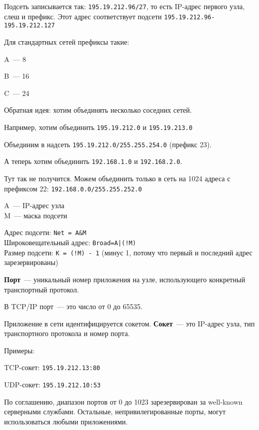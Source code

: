 Подсеть записывается так: {\tt 195.19.212.96/27}, то есть IP-адрес первого узла, слеш и префикс. Этот адрес соответствует подсети {\tt 195.19.212.96-195.19.212.127}

Для стандартных сетей префиксы такие:
\begin{MyItemize}
    \item A~--- 8
    \item B~--- 16
    \item C~--- 24
\end{MyItemize}


Обратная идея: хотим объединять несколько соседних сетей.

Например, хотим объединить {\tt 195.19.212.0} и {\tt 195.19.213.0}

Объединим в надсеть {\tt 195.19.212.0/255.255.254.0} (префикс 23).

А теперь хотим объединить {\tt 192.168.1.0} и {\tt 192.168.2.0}.

Тут так не получится. Можем объединить только в сеть на 1024 адреса с префиксом 22: {\tt 192.168.0.0/255.255.252.0}


A~--- IP-адрес узла\\
M~--- маска подсети

Адрес подсети: {\tt Net = A\&M}\\
Широковещательный адрес: {\tt Broad=A|(!M)}\\
Размер подсети: {\tt K = (!M) - 1} (минус 1, потому что первый и последний адрес зарезервированы)


{\bf Порт}~--- уникальный номер приложения на узле, использующего конкретный транспортный протокол.

В TCP/IP порт~--- это число от 0 до 65535.

Приложение в сети идентифицируется сокетом. {\bf Сокет}~--- это IP-адрес узла, тип транспортного протокола и номер порта.

Примеры:
\begin{MyItemize}
    \item TCP-сокет: {\tt 195.19.212.13:80}
    \item UDP-сокет: {\tt 195.19.212.10:53}
\end{MyItemize}

По соглашению, диапазон портов от 0 до 1023 зарезервирован за well-known серверными службами. Остальные, непривилегированные порты, могут использоваться любыми приложениями. 